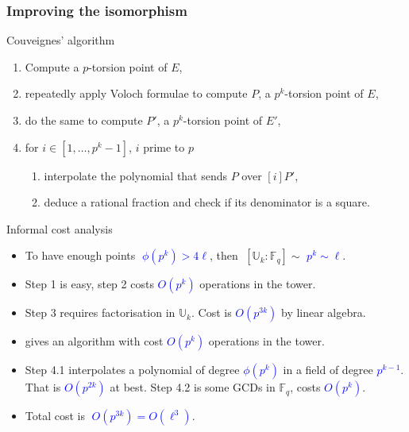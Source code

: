 \documentclass[10pt]{beamer}
\newcommand{\blue}[1]{\textcolor{blue}{#1}}  %
\newcommand{\U}{\mathbb{U}}  %
\newcommand{\F}{\mathbb{F}}  %
\newcommand{\euler}{\phi}  %
\newcommand{\0}{\mathcal{O}}  %
\begin{document}

\begin{frame}
  \frametitle{Improving the isomorphism}

  \vspace{-1mm}

  \begin{block}{Couveignes' algorithm}
    \begin{enumerate}
    \item Compute a $p$-torsion point of $E$,
    \item repeatedly apply Voloch formulae to compute $P$, a $p^k$-torsion
      point of $E$,
    \item \alert<1>{do the same to compute $P'$, a $p^k$-torsion point
      of $E'$,}
    \item for $i \in [1,\dots,p^k-1]$, $i$ prime to $p$
      \begin{enumerate}
      \item interpolate the polynomial that sends $P$ over $[i]P'$,
      \item deduce a rational fraction and check if its denominator is
        a square.
      \end{enumerate}
    \end{enumerate}
  \end{block}

  \vspace{-1mm}

  \begin{block}{Informal cost analysis}
    \begin{itemize}
    \item<0> To have enough points \blue{$\;\euler(p^k) > 4\ell$}, then
      $\;[\U_k:\F_q] \sim$ \blue{$p^k \sim \ell$}.
    \item<0> Step 1 is easy, step 2 costs \blue{$O(p^k)$}
      operations in the tower.
    \item<1> \alert{Step 3 requires factorisation in $\U_k$. Cost is
      \blue{$O(p^{3k})$} by linear algebra.}
    \item<1> \cite{Couveignes00} gives an algorithm with cost
      \blue{$O(p^k)$} operations in the tower.
    \item<0> Step 4.1 interpolates a polynomial of degree
      \blue{$\euler(p^k)$} in a field of degree \blue{$p^{k-1}$}. That
      is \blue{$O(p^{2k})$} at best.  Step 4.2 is some GCDs
      in $\F_q$, costs \blue{$O(p^k)$}.
    \item<0> Total cost is \blue{$\;O(p^{3k}) = O(\ell^3)$}.
    \end{itemize}
  \end{block}
\end{frame}
\end{document}
